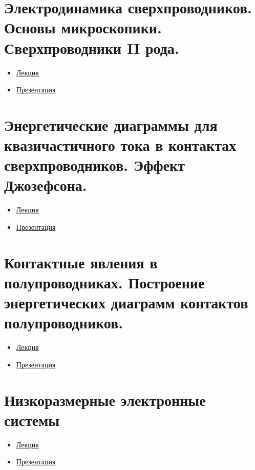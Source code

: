\documentclass[a4paper]{article}
\begin{document}
\section{Электродинамика сверхпроводников. Основы микроскопики. Сверхпроводники II рода.}
\begin{multicols}{2}
\begin{itemize}
\item 
\href{run:./lec-text/09-supercond-2021_mar28.pdf}{Лекция}
\item 
\href{run:./lec-pres/2021-slides09-fact.pdf}{Презентация}
\end{itemize}
\end{multicols}
\section{Энергетические диаграммы для квазичастичного тока в контактах сверхпроводников. Эффект Джозефсона.}
\begin{multicols}{2}
\begin{itemize}
\item 
\href{run:./lec-text/10-squid-2021_apr05.pdf}{Лекция}
\item 
\href{run:./lec-pres/2021-slides10.pdf}{Презентация}
\end{itemize}
\end{multicols}
\section{Контактные явления в полупроводниках. Построение энергетических диаграмм контактов
полупроводников.}
\begin{multicols}{2}
\begin{itemize}
\item 
\href{run:./lec-text/11-semi2-2021-apr11.pdf}{Лекция}
\item 
\href{run:./lec-pres/11-slides-2021.pdf}{Презентация}
\end{itemize}
\end{multicols}
\section{Низкоразмерные электронные системы}
\begin{multicols}{2}
\begin{itemize}
\item 
\href{run:./lec-text/12-lowdim_2021_apr18.pdf}{Лекция}
\item 
\href{run:./lec-pres/12-slides-2021_2.pdf}{Презентация}
\end{itemize}
\end{multicols}
\end{document}
